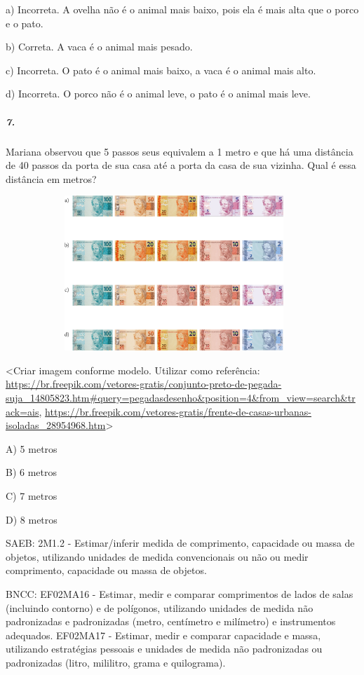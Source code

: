 a) Incorreta. A ovelha não é o animal mais baixo, pois ela é mais alta
que o porco e o pato.

b) Correta. A vaca é o animal mais pesado.

c) Incorreta. O pato é o animal mais baixo, a vaca é o animal mais alto.

d) Incorreta. O porco não é o animal leve, o pato é o animal mais leve.

\subparagraph{7. }\label{section-106}

Mariana observou que 5 passos seus equivalem a 1 metro e que há uma
distância de 40 passos da porta de sua casa até a porta da casa de sua
vizinha. Qual é essa distância em metros?

\includegraphics[width=5.00000in,height=2.30208in]{media/image115.png}

\textless{}Criar imagem conforme modelo. Utilizar como referência:
\url{https://br.freepik.com/vetores-gratis/conjunto-preto-de-pegada-suja_14805823.htm\#query=pegadasdesenho\&position=4\&from_view=search\&track=ais},
\url{https://br.freepik.com/vetores-gratis/frente-de-casas-urbanas-isoladas_28954968.htm}\textgreater{}

A) 5 metros

B) 6 metros

C) 7 metros

D) 8 metros

SAEB: 2M1.2 - Estimar/inferir medida de comprimento, capacidade ou massa
de objetos, utilizando unidades de medida convencionais ou não ou medir
comprimento, capacidade ou massa de objetos.

BNCC: EF02MA16 - Estimar, medir e comparar comprimentos de lados de
salas (incluindo contorno) e de polígonos, utilizando unidades de medida
não padronizadas e padronizadas (metro, centímetro e milímetro) e
instrumentos adequados. EF02MA17 - Estimar, medir e comparar capacidade
e massa, utilizando estratégias pessoais e unidades de medida não
padronizadas ou padronizadas (litro, mililitro, grama e quilograma).

